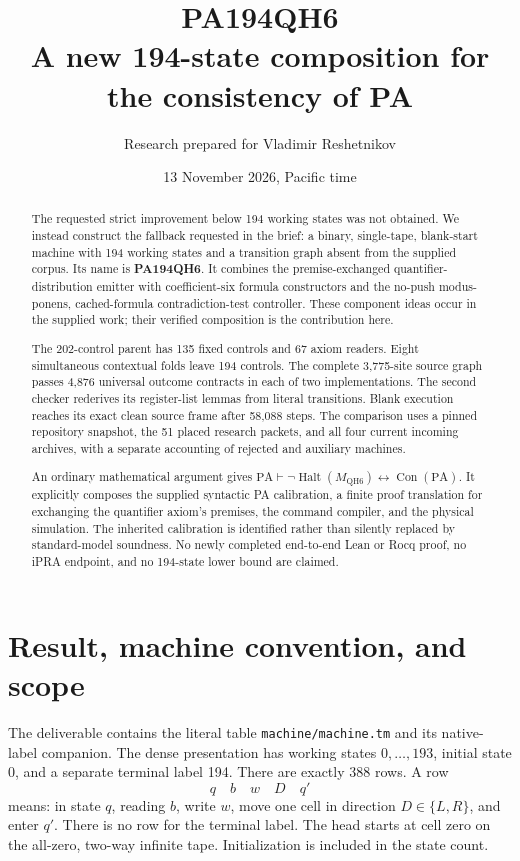 \documentclass[11pt,letterpaper]{article}
\title{PA194QH6\\A new 194-state composition for the consistency of PA}
\author{Research prepared for Vladimir Reshetnikov}
\date{13 November 2026, Pacific time}
\newcommand{\PA}{\mathrm{PA}}
\newcommand{\Con}{\operatorname{Con}}
\newcommand{\Halt}{\operatorname{Halt}}
\newcommand{\file}[1]{\texttt{\nolinkurl{#1}}}
\newcommand{\MX}{M_{\mathrm{QH6}}}
\begin{document}
\maketitle
\begin{abstract}
The requested strict improvement below 194 working states was not obtained.
We instead construct the fallback requested in the brief: a binary,
single-tape, blank-start machine with 194 working states and a transition
graph absent from the supplied corpus. Its name is \textbf{PA194QH6}.
It combines the premise-exchanged quantifier-distribution emitter with
coefficient-six formula constructors and the no-push modus-ponens,
cached-formula contradiction-test controller. These component ideas occur
in the supplied work; their verified composition is the contribution here.

The 202-control parent has 135 fixed controls and 67 axiom readers.
Eight simultaneous contextual folds leave 194 controls. The complete
3,775-site source graph passes 4,876 universal outcome contracts in each
of two implementations. The second checker rederives its register-list
lemmas from literal transitions. Blank execution reaches its exact clean
source frame after 58,088 steps. The comparison uses a pinned repository
snapshot, the 51 placed research packets, and all four current incoming
archives, with a separate accounting of rejected and auxiliary machines.

An ordinary mathematical argument gives
\(\PA\vdash\neg\Halt(\MX)\leftrightarrow\Con(\PA)\).
It explicitly composes the supplied syntactic PA calibration, a finite
proof translation for exchanging the quantifier axiom's premises, the
command compiler, and the physical simulation. The inherited calibration
is identified rather than silently replaced by standard-model soundness.
No newly completed end-to-end Lean or Rocq proof, no iPRA endpoint, and no
194-state lower bound are claimed.
\end{abstract}
\clearpage\tableofcontents\newpage

\section{Result, machine convention, and scope}

The deliverable contains the literal table \file{machine/machine.tm} and
its native-label companion. The dense presentation has working states
\(0,\ldots,193\), initial state 0, and a separate terminal label 194.
There are exactly 388 rows. A row
\[
  q\quad b\quad w\quad D\quad q'
\]
means: in state \(q\), reading \(b\), write \(w\), move one cell in
direction \(D\in\{L,R\}\), and enter \(q'\). There is no row for the
terminal label. The head starts at cell zero on the all-zero, two-way
infinite tape. Initialization is included in the state count.
\end{document}
